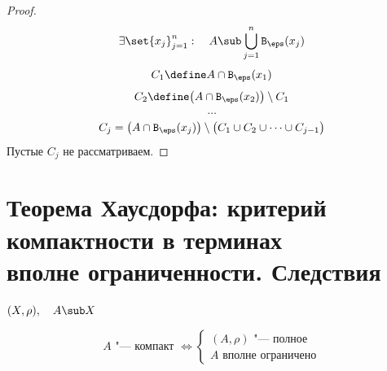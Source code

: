 \begin{proof}
	$$ \exists \set{x_j}_{j = 1}^n : \quad A \sub \bigcup_{j = 1}^n \mathtt B_\eps(x_j) $$
	$$ C_1 \define A \cap \mathtt B_\eps(x_1) $$
	$$ C_2 \define \bigl( A \cap \mathtt B_\eps(x_2) \bigr) \setminus C_1 $$
	$$ \dots $$
	$$ C_j = \bigl( A \cap \mathtt B_\eps(x_j) \bigr) \setminus \bigl( C_1 \cup C_2 \cup \dots \cup C_{j - 1} \bigr) $$
	Пустые $ C_j $ не рассматриваем.
\end{proof}

\section[Теорема Хаусдорфа: критерий компактности в терминах вполне ограниченности.
Следствия]
{Теорема Хаусдорфа: критерий компактности в терминах \\
вполне ограниченности.
Следствия}

\begin{theorem}
	$ (X, \rho), \quad A \sub X $

	$$ A \text{ "--- компакт } \iff
	\begin{cases}
		(A, \rho) \text{ "--- полное} \\
		A \text{ вполне ограничено}
	\end{cases} $$
\end{theorem}

